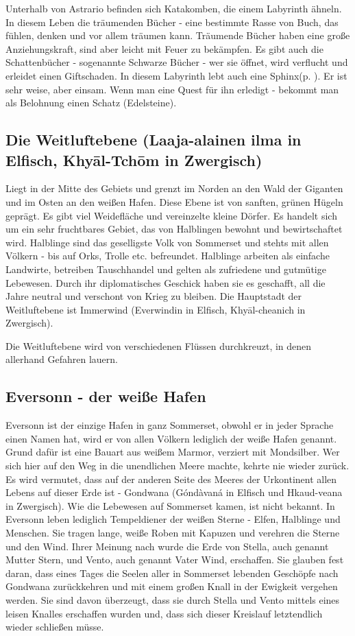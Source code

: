\documentclass[11pt, twoside]{article}
\begin{document}
Unterhalb von Astrario befinden sich Katakomben, die einem Labyrinth ähneln. In diesem Leben die träumenden Bücher - eine bestimmte Rasse von Buch, das fühlen, denken und vor allem träumen kann. Träumende Bücher haben eine große Anziehungskraft, sind aber leicht mit Feuer zu bekämpfen. Es gibt auch die Schattenbücher - sogenannte Schwarze Bücher - wer sie öffnet, wird verflucht und erleidet einen Giftschaden. In diesem Labyrinth lebt auch eine Sphinx(p. \pageref{sphinx}). Er ist sehr weise, aber einsam. Wenn man eine Quest für ihn erledigt - bekommt man als Belohnung einen Schatz (Edelsteine).

\subsection{Die Weitluftebene (Laaja-alainen ilma in Elfisch, Khyāl-Tchōm in Zwergisch)}
\label{sec:org426eae5}
Liegt in der Mitte des Gebiets und grenzt im Norden an den Wald der Giganten und im Osten an den weißen Hafen. Diese Ebene ist von sanften, grünen Hügeln geprägt. Es gibt viel Weidefläche und vereinzelte kleine Dörfer. Es handelt sich um ein sehr fruchtbares Gebiet, das von Halblingen bewohnt und bewirtschaftet wird. Halblinge sind das geselligste Volk von Sommerset und stehts mit allen Völkern - bis auf Orks, Trolle etc. befreundet. Halblinge arbeiten als einfache Landwirte, betreiben Tauschhandel und gelten als zufriedene und gutmütige Lebewesen. Durch ihr diplomatisches Geschick haben sie es geschafft, all die Jahre neutral und verschont von Krieg zu bleiben. Die Hauptstadt der Weitluftebene ist Immerwind (Everwindin in Elfisch, Khyāl-cheanich in Zwergisch).

Die Weitluftebene wird von verschiedenen Flüssen durchkreuzt, in denen allerhand Gefahren lauern.

\subsection{Eversonn - der weiße Hafen}
\label{sec:orgac326c7}
Eversonn ist der einzige Hafen in ganz Sommerset, obwohl er in jeder Sprache einen Namen hat, wird er von allen Völkern lediglich der weiße Hafen genannt. Grund dafür ist eine Bauart aus weißem Marmor, verziert mit Mondsilber. Wer sich hier auf den Weg in die unendlichen Meere machte, kehrte nie wieder zurück. Es wird vermutet, dass auf der anderen Seite des Meeres der Urkontinent allen Lebens auf dieser Erde ist - Gondwana (Góndàvaná in Elfisch und Hkaud-veana in Zwergisch). Wie die Lebewesen auf Sommerset kamen, ist nicht bekannt. In Eversonn leben lediglich Tempeldiener der weißen Sterne - Elfen, Halblinge und Menschen. Sie tragen lange, weiße Roben mit Kapuzen und verehren die Sterne und den Wind. Ihrer Meinung nach wurde die Erde von Stella, auch genannt Mutter Stern, und Vento, auch genannt Vater Wind, erschaffen. Sie glauben fest daran, dass eines Tages die Seelen aller in Sommerset lebenden Geschöpfe nach Gondwana zurückkehren und mit einem großen Knall in der Ewigkeit vergehen werden. Sie sind davon überzeugt, dass sie durch Stella und Vento mittels eines leisen Knalles erschaffen wurden und, dass sich dieser Kreislauf letztendlich wieder schließen müsse.
\end{document}
